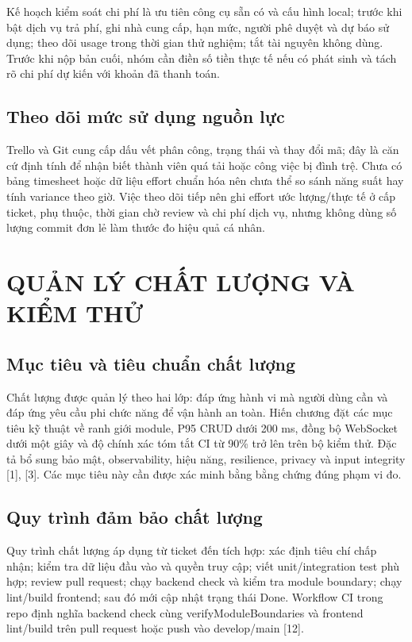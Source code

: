 \documentclass[12pt,a4paper]{report}
\begin{document}
Kế hoạch kiểm soát chi phí là ưu tiên công cụ sẵn có và cấu hình local; trước khi bật dịch vụ trả phí, ghi nhà cung cấp, hạn mức, người phê duyệt và dự báo sử dụng; theo dõi usage trong thời gian thử nghiệm; tắt tài nguyên không dùng. Trước khi nộp bản cuối, nhóm cần điền số tiền thực tế nếu có phát sinh và tách rõ chi phí dự kiến với khoản đã thanh toán.

\section{Theo dõi mức sử dụng nguồn lực}
Trello và Git cung cấp dấu vết phân công, trạng thái và thay đổi mã; đây là căn cứ định tính để nhận biết thành viên quá tải hoặc công việc bị đình trệ. Chưa có bảng timesheet hoặc dữ liệu effort chuẩn hóa nên chưa thể so sánh năng suất hay tính variance theo giờ. Việc theo dõi tiếp nên ghi effort ước lượng/thực tế ở cấp ticket, phụ thuộc, thời gian chờ review và chi phí dịch vụ, nhưng không dùng số lượng commit đơn lẻ làm thước đo hiệu quả cá nhân.

\chapter{QUẢN LÝ CHẤT LƯỢNG VÀ KIỂM THỬ}
\section{Mục tiêu và tiêu chuẩn chất lượng}
Chất lượng được quản lý theo hai lớp: đáp ứng hành vi mà người dùng cần và đáp ứng yêu cầu phi chức năng để vận hành an toàn. Hiến chương đặt các mục tiêu kỹ thuật về ranh giới module, P95 CRUD dưới 200 ms, đồng bộ WebSocket dưới một giây và độ chính xác tóm tắt CI từ 90\% trở lên trên bộ kiểm thử. Đặc tả bổ sung bảo mật, observability, hiệu năng, resilience, privacy và input integrity [1], [3]. Các mục tiêu này cần được xác minh bằng bằng chứng đúng phạm vi đo.

\section{Quy trình đảm bảo chất lượng}
Quy trình chất lượng áp dụng từ ticket đến tích hợp: xác định tiêu chí chấp nhận; kiểm tra dữ liệu đầu vào và quyền truy cập; viết unit/integration test phù hợp; review pull request; chạy backend check và kiểm tra module boundary; chạy lint/build frontend; sau đó mới cập nhật trạng thái Done. Workflow CI trong repo định nghĩa backend check cùng verifyModuleBoundaries và frontend lint/build trên pull request hoặc push vào develop/main [12].
\end{document}
